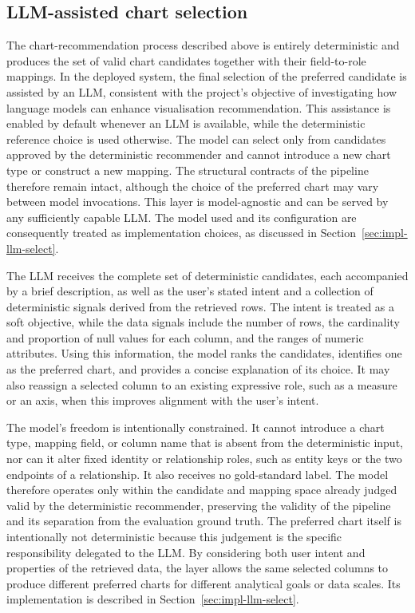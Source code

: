 \subsection{LLM-assisted chart selection}
\label{sec:step2-llm}

The chart-recommendation process described above is entirely deterministic and produces the set of valid chart candidates together with their field-to-role mappings. In the deployed system, the final selection of the preferred candidate is assisted by an LLM, consistent with the project’s objective of investigating how language models can enhance visualisation recommendation. This assistance is enabled by default whenever an LLM is available, while the deterministic reference choice is used otherwise. The model can select only from candidates approved by the deterministic recommender and cannot introduce a new chart type or construct a new mapping. The structural contracts of the pipeline therefore remain intact, although the choice of the preferred chart may vary between model invocations. This layer is model-agnostic and can be served by any sufficiently capable LLM. The model used and its configuration are consequently treated as implementation choices, as discussed in Section~\ref{sec:impl-llm-select}.

The LLM receives the complete set of deterministic candidates, each accompanied by a brief description, as well as the user’s stated intent and a collection of deterministic signals derived from the retrieved rows. The intent is treated as a soft objective, while the data signals include the number of rows, the cardinality and proportion of null values for each column, and the ranges of numeric attributes. Using this information, the model ranks the candidates, identifies one as the preferred chart, and provides a concise explanation of its choice. It may also reassign a selected column to an existing expressive role, such as a measure or an axis, when this improves alignment with the user’s intent.

The model’s freedom is intentionally constrained. It cannot introduce a chart type, mapping field, or column name that is absent from the deterministic input, nor can it alter fixed identity or relationship roles, such as entity keys or the two endpoints of a relationship. It also receives no gold-standard label. The model therefore operates only within the candidate and mapping space already judged valid by the deterministic recommender, preserving the validity of the pipeline and its separation from the evaluation ground truth. The preferred chart itself is intentionally not deterministic because this judgement is the specific responsibility delegated to the LLM. By considering both user intent and properties of the retrieved data, the layer allows the same selected columns to produce different preferred charts for different analytical goals or data scales. Its implementation is described in Section~\ref{sec:impl-llm-select}.



